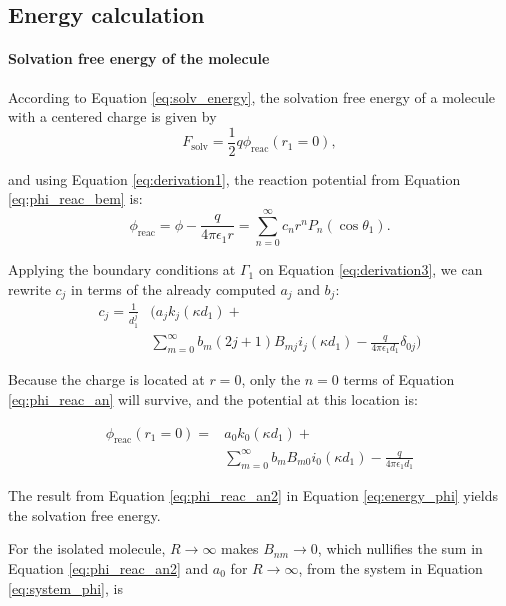 \subsection{Energy calculation} \label{energy_analytical}


 \medskip
 \paragraph*{Solvation free energy of the molecule}
According to Equation \eqref{eq:solv_energy}, the solvation free energy of a molecule with a centered charge is given by
%
\begin{equation} \label{eq:energy_phi}
F_{\text{solv}} = \frac{1}{2} q \phi_{\text{reac}}(r_1=0),
\end{equation} 
 
 \noindent and using Equation \eqref{eq:derivation1}, the reaction potential from Equation \eqref{eq:phi_reac_bem} is:
 \begin{equation} \label{eq:phi_reac_an}
 \phi_{\text{reac}} = \phi - \frac{q}{4\pi\epsilon_1 r} = \sum_{n=0}^{\infty} c_n r^n P_n(\cos \theta_1).
 \end{equation}
 
 Applying the boundary conditions at $\Gamma_1$ on Equation  \eqref{eq:derivation3}, we can rewrite $c_j$ in terms of the already computed $a_j$ and $b_j$:
 \begin{align}
 c_j = \frac{1}{d_1^j} & \Big(a_j k_j(\kappa d_1) + \nonumber \\
&  \sum_{m=0}^{\infty} b_m(2j+1)B_{mj} i_j(\kappa d_1) - \frac{q}{4\pi\epsilon_1 d_1} \delta_{0j} \Big)
 \end{align} 
 
Because the charge is located at $r=0$, only the $n=0$ terms of Equation \eqref{eq:phi_reac_an} will survive, and the potential at this location is:
 
 \begin{align} \label{eq:phi_reac_an2}
 \phi_{\text{reac}} (r_1=0) = & a_0 k_0(\kappa d_1) + \nonumber \\
 &\sum_{m=0}^{\infty} b_m B_{m0}i_0(\kappa d_1) - \frac{q}{4\pi\epsilon_1 d_1}
 \end{align}
 
 The result from Equation \eqref{eq:phi_reac_an2} in Equation \eqref{eq:energy_phi} yields the solvation free energy. 
 
For the isolated molecule, $R \to \infty$ makes $B_{nm} \to 0$, which nullifies the sum in Equation \eqref{eq:phi_reac_an2} and $a_0$ for $R \to \infty$, from the system in Equation \eqref{eq:system_phi}, is 

